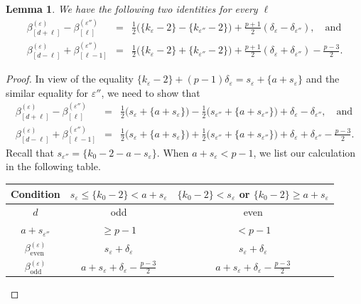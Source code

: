 \documentclass[12pt]{amsart}
\newtheorem{lemma}[subsection]{Lemma}
\theoremstyle{definition}
\numberwithin{equation}{subsection}
\newcommand{\even}{\mathrm{even}}
\newcommand{\odd}{\mathrm{odd}}
\begin{document}
\begin{lemma}
\label{L:case-by-case check AL}
We have the following two identities for every $\ell$
\begin{eqnarray*}
\beta_{[d+\ell]}^{(\varepsilon)}-\beta_{[\ell]}^{(\varepsilon'')} &=&\tfrac12\big(\{k_\varepsilon-2\}-\{k_{\varepsilon''}-2\}\big) + \tfrac{p+1}2( \delta_\varepsilon-\delta_{\varepsilon''} ), \quad\textrm{and}
\\
\beta_{[d-\ell]}^{(\varepsilon)} + \beta_{[\ell-1]}^{(\varepsilon'')}&=& \tfrac12\big(\{k_\varepsilon - 2\} + \{k_{\varepsilon''}-2\} \big)  + \tfrac{p+1}2 (\delta_\varepsilon + \delta_{\varepsilon''}) - \tfrac{p-3}2.
\end{eqnarray*}
\end{lemma}
\begin{proof}
In view of the equality $\{k_\varepsilon -2 \} + (p-1)\delta_\varepsilon = s_\varepsilon +\{a+s_\varepsilon\}$ and the similar equality for $\varepsilon''$, we need to show that
\begin{eqnarray}
\label{E:beta + beta and beta - beta}
\beta_{[d+\ell]}^{(\varepsilon)}-\beta_{[\ell]}^{(\varepsilon'')} & =&\tfrac12\big(s_\varepsilon + \{a+s_\varepsilon\}\big) -\tfrac 12\big(s_{\varepsilon''} + \{a+s_{\varepsilon''}\}\big) +  \delta_\varepsilon-\delta_{\varepsilon''}, \quad\textrm{and}
\\
\label{E:beta + beta and beta - beta-continued}
\beta_{[d-\ell]}^{(\varepsilon)} + \beta_{[\ell-1]}^{(\varepsilon'')} &=&\tfrac12\big(s_\varepsilon+ \{a+s_\varepsilon \} \big) + \tfrac12\big(s_{\varepsilon''} + \{a+s_{\varepsilon''}\}\big) + \delta_\varepsilon + \delta_{\varepsilon''} -\tfrac{p-3}2.
\end{eqnarray}
Recall that $s_{\varepsilon''} = \{k_0-2-a-s_\varepsilon \}$.
When $a+s_\varepsilon < p-1$, we list our calculation  in the following table. 
\begin{center}
\begin{tabular}{|c|c|c|}
\hline
Condition & $s_\varepsilon\leq  \{k_0-2\} < a+s_\varepsilon$ &$\{k_0-2\}< s_\varepsilon $ or $\{k_0-2\} \geq a+s_\varepsilon$
\\
\hline 
$d$ &  odd & even
\\ 
\hline
$a+ s_{\varepsilon''}$ &  $\geq p-1$ & $< p-1$
\\
\hline 
$\beta^{(\varepsilon)}_\even$ & $s_\varepsilon + \delta_\varepsilon$& $s_\varepsilon + \delta_\varepsilon$
\\
\hline 
$\beta^{(\varepsilon)}_\odd$ & $a+s_\varepsilon + \delta_\varepsilon - \frac{p-3}2$ & $a+s_\varepsilon + \delta_\varepsilon - \frac{p-3}2$ 

\end{tabular}
\end{center}
\end{proof}
\end{document}
